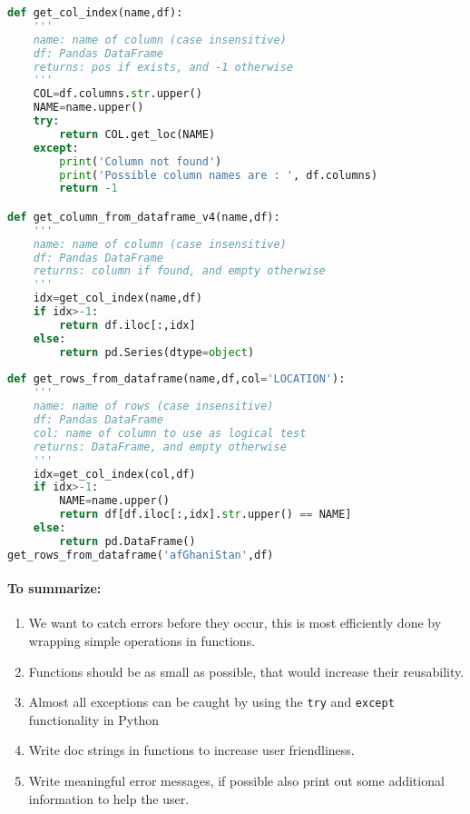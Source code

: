 \documentclass[graybox,sectrefs,envcountresetchap,open=right,final]{svmonodo}
\begin{document}
\begin{lstlisting}[language=python,style=blue1bar]
def get_col_index(name,df):
    '''
    name: name of column (case insensitive)
    df: Pandas DataFrame
    returns: pos if exists, and -1 otherwise 
    '''
    COL=df.columns.str.upper()
    NAME=name.upper()
    try:
        return COL.get_loc(NAME)
    except:
        print('Column not found')
        print('Possible column names are : ', df.columns)
        return -1

def get_column_from_dataframe_v4(name,df):
    '''
    name: name of column (case insensitive)
    df: Pandas DataFrame
    returns: column if found, and empty otherwise 
    '''
    idx=get_col_index(name,df)
    if idx>-1:
        return df.iloc[:,idx]
    else:
        return pd.Series(dtype=object)
        
def get_rows_from_dataframe(name,df,col='LOCATION'):
    '''
    name: name of rows (case insensitive)
    df: Pandas DataFrame
    col: name of column to use as logical test
    returns: DataFrame, and empty otherwise 
    '''
    idx=get_col_index(col,df)
    if idx>-1:
        NAME=name.upper()
        return df[df.iloc[:,idx].str.upper() == NAME]
    else:
        return pd.DataFrame()
get_rows_from_dataframe('afGhaniStan',df)

\end{lstlisting}


\paragraph{To summarize:}

\begin{enumerate}
\item We want to catch errors before they occur, this is most efficiently done by wrapping simple operations in functions.

\item Functions should be as small as possible, that would increase their reusability.

\item Almost all exceptions can be caught by using the \texttt{try} and \texttt{except} functionality in Python

\item Write doc strings in functions to increase user friendliness.

\item Write meaningful error messages, if possible also print out some additional information to help the user.
\end{enumerate}
\end{document}
